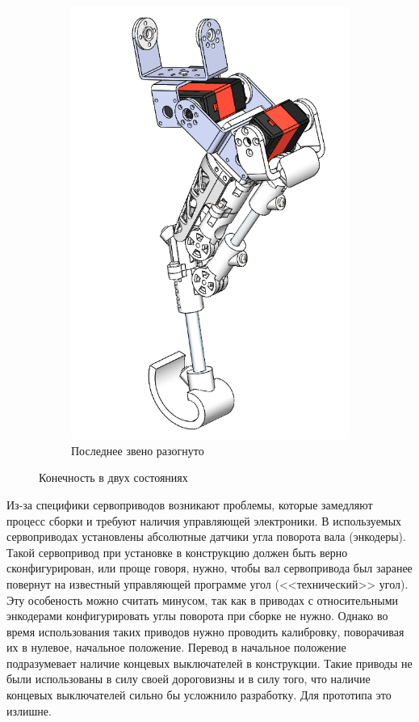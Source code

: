 \begin{figure}[ht]
\begin{subfigure}[b]{0.45\textwidth}
        \includegraphics[scale=0.55]{chapter_mechanics_construction/figure16.png}
        \caption{Последнее звено разогнуто}
    \end{subfigure}
     
    \caption{Конечность в двух состояниях}
    \label{}
\end{figure}

Из-за специфики сервоприводов возникают проблемы, которые замедляют процесс сборки и требуют наличия управляющей электроники. В используемых сервоприводах установлены абсолютные датчики угла поворота вала (энкодеры). Такой сервопривод при установке в конструкцию должен быть верно сконфигурирован, или проще говоря, нужно, чтобы вал сервопривода был заранее повернут на известный управляющей программе угол (<<технический>> угол). Эту особеность можно считать минусом, так как в приводах с относительными энкодерами конфигурировать углы поворота при сборке не нужно. Однако во время использования таких приводов нужно проводить калибровку, поворачивая их в нулевое, начальное положение. Перевод в начальное положение подразумевает наличие концевых выключателей в конструкции. Такие приводы не были использованы в силу своей дороговизны и в силу того, что наличие концевых выключателей сильно бы усложнило разработку. Для прототипа это излишне.

